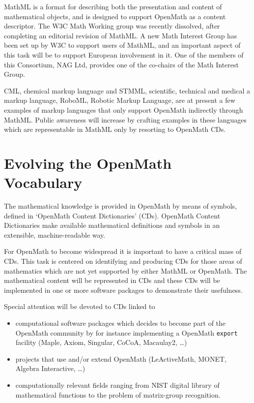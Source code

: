 \documentclass[draft]{artikel3}
\begin{document}
MathML is a format for describing both the presentation and content of
mathematical objects, and is designed to support OpenMath as a content
descriptor.  The W3C Math Working group was recently dissolved, after
completing an editorial revision of MathML.  A new Math Interest Group
has been set up by W3C to support users of MathML, and an important
aspect of this task will be to support European involvement in it.
One of the members of this Consortium, NAG Ltd, provides one of the
co-chairs of the Math Interest Group.

CML, chemical markup language and STMML, scientific, technical and
medical a markup language, RoboML, Robotic Markup Language, are at
present a few examples of markup languages that only support OpenMath
indirectly through MathML.  Public awareness will increase by crafting
examples in these languages which are representable in MathML only by
resorting to OpenMath CDs.

\section{Evolving the OpenMath Vocabulary}
\label{sec:OCD}

The mathematical knowledge is provided in OpenMath by means of
symbols, defined in `OpenMath Content Dictionaries' (CDs).  OpenMath
Content Dictionaries make available mathematical definitions and
symbols in an extensible, machine-readable way.

For OpenMath to become widespread it is important to have a critical
mass of CDs. This task is centered on identifying and producing CDs
for those areas of mathematics which are not yet supported by either
MathML or OpenMath. The mathematical content will be represented in
CDs and these CDs will be implemented in one or more software packages
to demonstrate their usefulness.

Special attention will be devoted to CDs linked to 
\begin{itemize}
  
\item computational software packages which decides to become part of
  the OpenMath community by for instance implementing a OpenMath
  \texttt{export} facility (Maple, Axiom, Singular, CoCoA, Macaulay2,
  \ldots)
  
\item projects that use and/or extend OpenMath (LeActiveMath, MONET,
  Algebra Interactive, \ldots)
  
\item computationally relevant fields ranging from NIST digital
  library of mathematical functions to the problem of matrix-group
  recognition.

\end{itemize}
\end{document}
